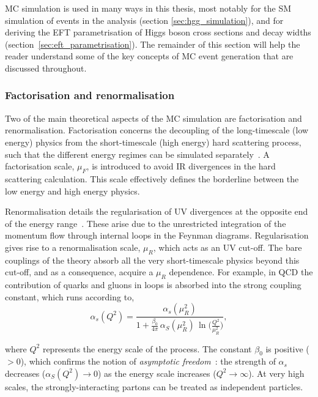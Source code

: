 MC simulation is used in many ways in this thesis, most notably for the SM simulation of events in the \Hgg analysis (section \ref{sec:hgg_simulation}), and for deriving the EFT parametrisation of Higgs boson cross sections and decay widths (section~\ref{sec:eft_parametrisation}). The remainder of this section will help the reader understand some of the key concepts of MC event generation that are discussed throughout.

\subsubsection{Factorisation and renormalisation}
Two of the main theoretical aspects of the MC simulation are factorisation and renormalisation. Factorisation concerns the decoupling of the long-timescale (low energy) physics from the short-timescale (high energy) hard scattering process, such that the different energy regimes can be simulated separately~\cite{doi:10.1146_annurev.nucl.55.090704.151505}. A factorisation scale, $\mu_F$, is introduced to avoid IR divergences in the hard scattering calculation. This scale effectively defines the borderline between the low energy and high energy physics.

Renormalisation details the regularisation of UV divergences at the opposite end of the energy range~\cite{Brock:1993sz}. These arise due to the unrestricted integration of the momentum flow through internal loops in the Feynman diagrams. Regularisation gives rise to a renormalisation scale, $\mu_R$, which acts as an UV cut-off. The bare couplings of the theory absorb all the very short-timescale physics beyond this cut-off, and as a consequence, acquire a $\mu_R$ dependence. For example, in QCD the contribution of quarks and gluons in loops is absorbed into the strong coupling constant, which runs according to,
\begin{equation}
    \alpha_s(Q^2) = \frac{\alpha_s(\mu_R^2)}{1+\frac{\beta_0}{4\pi}\,\alpha_S(\mu_R^2)\,\ln\Big(\frac{Q^2}{\mu_R^2}\Big)},
\end{equation}

\noindent
where $Q^2$ represents the energy scale of the process. The constant $\beta_0$ is positive ($>0$), which confirms the notion of \textit{asymptotic freedom}~\cite{PhysRevLett.30.1343}: the strength of $\alpha_s$ decreases ($\alpha_S(Q^2) \rightarrow 0$) as the energy scale increases ($Q^2\rightarrow\infty$). At very high scales, the strongly-interacting partons can be treated as independent particles. 

